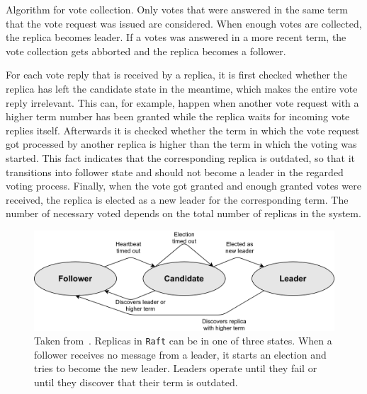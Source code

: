 \begin{algorithm}[H]\caption{Algorithm for vote collection. Only votes that were answered in the same term that the vote request was issued are considered. When enough votes are collected, the replica becomes leader. If a votes was answered in a more recent term, the vote collection gets abborted and the replica becomes a follower.}\label{algo:VoteCollection}

\BlankLine

\end{algorithm}

For each vote reply that is received by a replica, it is first checked whether the replica has left the candidate state in the meantime, which makes the entire vote reply irrelevant.
This can, for example, happen when another vote request with a higher term number has been granted while the replica waits for incoming vote replies itself.
Afterwards it is checked whether the term in which the vote request got processed by another replica is higher than the term in which the voting was started.
This fact indicates that the corresponding replica is outdated, so that it transitions into follower state and should not become a leader in the regarded voting process.
Finally, when the vote got granted and enough granted votes were received, the replica is elected as a new leader for the corresponding term.
The number of necessary voted depends on the total number of replicas in the system.

\begin{figure}[!hb]
	\centering
	\includegraphics[width=0.75\linewidth]{images/RaftServerStates}
	\caption{Taken from~\cite{RaftConsensusPaper}. Replicas in \texttt{Raft} can be in one of three states. When a follower receives no message from a leader, it starts an election and tries to become the new leader. Leaders operate until they fail or until they discover that their term is outdated.}
	\label{fig:RaftServerStates}
\end{figure}

